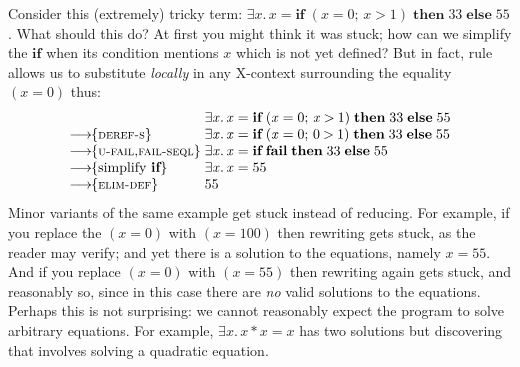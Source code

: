 \documentclass[acmsmall,review,anonymous,dvipsnames]{acmart}
\newcommand{\Varid}[1]{\mathit{#1}}
\begin{document}
Consider this (extremely) tricky term:
\ensuremath{\exists\Varid{x}.\,\Varid{x}\mathrel{=}\textbf{if}\;(\Varid{x}\mathrel{=}\mathrm{0};\,\Varid{x}\mathbin{>}\mathrm{1})\;\textbf{then}\;\mathrm{33}\;\textbf{else}\;\mathrm{55}}.
What should this do? At first you might think it was stuck; how can we simplify the \ensuremath{\textbf{if}}
when its condition mentions \ensuremath{\Varid{x}} which is not yet defined?  But in fact, rule  allows
us to substitute \emph{locally} in any X-context surrounding the equality \ensuremath{(\Varid{x}\mathrel{=}\mathrm{0})} thus:
$$
\begin{array}{l@{\;}l}
                                & \ensuremath{\exists\Varid{x}.\,\Varid{x}\mathrel{=}\textbf{if}\;(\Varid{x}\mathrel{=}\mathrm{0};\,\Varid{x}\mathbin{>}\mathrm{1})\;\textbf{then}\;\mathrm{33}\;\textbf{else}\;\mathrm{55}} \\
\movestoR{deref-s}              & \ensuremath{\exists\Varid{x}.\,\Varid{x}\mathrel{=}\textbf{if}\;(\Varid{x}\mathrel{=}\mathrm{0};\,\mathrm{0}\mathbin{>}\mathrm{1})\;\textbf{then}\;\mathrm{33}\;\textbf{else}\;\mathrm{55}} \\
\movestoR{u-fail,fail-seql}     & \ensuremath{\exists\Varid{x}.\,\Varid{x}\mathrel{=}\textbf{if}\;\textbf{fail}\;\textbf{then}\;\mathrm{33}\;\textbf{else}\;\mathrm{55}}\\
\movestoC{\text{simplify \ensuremath{\textbf{if}}}} & \ensuremath{\exists\Varid{x}.\,\Varid{x}\mathrel{=}\mathrm{55}} \\
\movestoR{elim-def}            & \ensuremath{\mathrm{55}}
\end{array}
$$
Minor variants of the same example get stuck instead of reducing. For example, if you replace
the \ensuremath{(\Varid{x}\mathrel{=}\mathrm{0})} with \ensuremath{(\Varid{x}\mathrel{=}\mathrm{100})} then rewriting gets stuck, as the reader may verify; and yet there
is a solution to the equations, namely $x=55$.
And if you replace \ensuremath{(\Varid{x}\mathrel{=}\mathrm{0})} with \ensuremath{(\Varid{x}\mathrel{=}\mathrm{55})} then rewriting again
gets stuck, and reasonably so, since in this case there are \emph{no} valid solutions to the equations.
Perhaps this is not surprising: we cannot reasonably expect the program to solve arbitrary equations.
For example, \ensuremath{\exists\Varid{x}.\,\Varid{x}\mathbin{*}\Varid{x}\mathrel{=}\Varid{x}} has two solutions but discovering that involves solving a quadratic equation.
\end{document}

